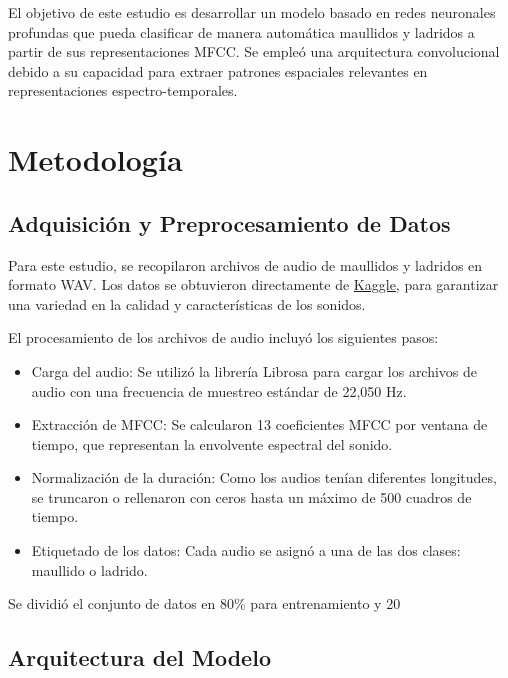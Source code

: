 \documentclass[journal]{IEEEtran}
\begin{document}
El objetivo de este estudio es desarrollar un modelo basado en redes neuronales profundas que pueda clasificar de manera automática maullidos y ladridos a partir de sus representaciones MFCC. Se empleó una arquitectura convolucional debido a su capacidad para extraer patrones espaciales relevantes en representaciones espectro-temporales.



\section{Metodología}
\subsection{Adquisición y Preprocesamiento de Datos}

Para este estudio, se recopilaron archivos de audio de maullidos y ladridos en formato WAV. Los datos se obtuvieron directamente de \href{https://www.kaggle.com/datasets/mmoreaux/audio-cats-and-dogs}{Kaggle}, para garantizar una variedad en la calidad y características de los sonidos.

El procesamiento de los archivos de audio incluyó los siguientes pasos:
\begin{itemize}
    \item Carga del audio: Se utilizó la librería Librosa para cargar los archivos de audio con una frecuencia de muestreo estándar de 22,050 Hz.
    \item Extracción de MFCC: Se calcularon 13 coeficientes MFCC por ventana de tiempo, que representan la envolvente espectral del sonido.
    \item Normalización de la duración: Como los audios tenían diferentes longitudes, se truncaron o rellenaron con ceros hasta un máximo de 500 cuadros de tiempo.
    \item Etiquetado de los datos: Cada audio se asignó a una de las dos clases: maullido o ladrido.
\end{itemize}

Se dividió el conjunto de datos en 80\% para entrenamiento y 20%

\subsection{Arquitectura del Modelo}
\end{document}

